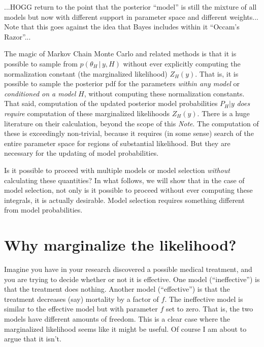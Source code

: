\documentclass[12pt]{article}
\newcommand{\documentname}{\textsl{Note}}
\newcommand{\given}{\,|\,}
\begin{document}
...HOGG return to the point that the posterior ``model''
  is still the mixture of all models
  but now with different support in parameter space and different weights...
Note that this goes against the idea that Bayes includes within it ``Occam's Razor''...

The magic of Markov Chain Monte Carlo and related methods is that
  it is possible to sample from $p(\theta_H\given y,H)$ without ever explicitly computing
  the normalization constant (the marginalized likelihood) $Z_H(y)$.
That is, it is possible to sample the posterior pdf for the parameters \emph{within any model}
  or \emph{conditioned on a model} $H$,
  without computing these normalization constants.
That said, computation of the updated posterior model probabilities $P_H|y$
  \emph{does require} computation of these marginalized likelihoods $Z_H(y)$.
There is a huge literature on their calculation, beyond the scope of this \documentname.
The computation of these is exceedingly non-trivial,
  because it requires (in some sense) search of the entire parameter space
  for regions of substantial likelihood.
But they are necessary
  for the updating of model probabilities.

Is it possible to proceed with multiple models or model selection
  \emph{without} calculating these quantities?
In what follows, we will show that in the case of model selection,
  not only is it possible to proceed without ever computing these integrals,
  it is actually desirable.
Model selection requires something different from model probabilities.

\section{Why marginalize the likelihood?}

Imagine you have in your research discovered a possible medical treatment,
  and you are trying to decide whether or not it is effective.
One model (``ineffective'') is that the treatment does nothing.
Another model (``effective'') is that the treatment decreases (say) mortality by a factor of $f$.
The ineffective model is similar to the effective model but with parameter $f$ set to zero.
That is, the two models have different amounts of freedom.
This is a clear case where the marginalized likelihood seems like it might be useful.
Of course I am about to argue that it isn't.
\end{document}
